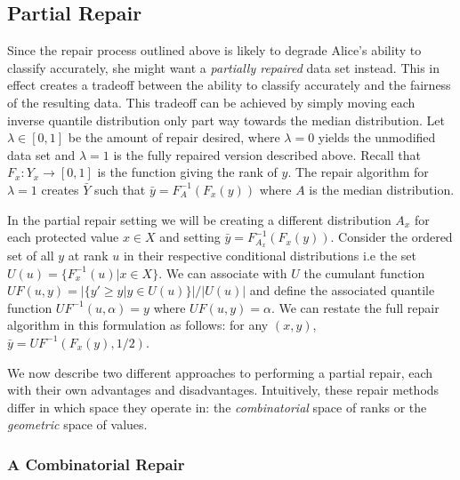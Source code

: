 \subsection{Partial Repair}
Since the repair process outlined above is likely to degrade Alice's ability to classify accurately, she might want a \emph{partially repaired} data set instead.  This in effect creates a tradeoff between the ability to classify accurately and the fairness of the resulting data. This tradeoff can be achieved by simply moving each inverse quantile distribution only part way towards the median distribution.  Let $\lambda \in [0,1]$ be the amount of repair desired, where $\lambda = 0$ yields the unmodified data set and $\lambda = 1$ is the fully repaired version described above.  Recall that $F_x: Y_x \rightarrow [0,1]$ is the function giving the rank of $y$.  The repair algorithm for $\lambda = 1$ creates $\bar{Y}$ such that $\bar{y} = F_{A}^{-1}(F_x(y))$ where $A$ is the median distribution.  

In the partial repair setting we will be creating a different distribution $A_x$ for each protected value $x \in X$ and setting $\bar{y} = F_{A_x}^{-1}(F_x(y))$. Consider the ordered set of all  $y$ at rank $u$ in their respective conditional distributions i.e the set $U(u) = \{ F_x^{-1}(u) | x \in X \}$. We can associate with $U$ the cumulant function $UF(u, y) = |\{ y' \ge y | y \in U(u) \}| / |U(u)|$ and define the associated quantile function $UF^{-1}(u, \alpha) = y$ where $UF(u, y) = \alpha$. We can restate the full repair algorithm in this formulation as follows: for any $(x,y)$,  $\bar{y} = UF^{-1}(F_x(y), 1/2)$. 

We now describe two different approaches to performing a partial repair, each with their own advantages and disadvantages. Intuitively, these repair methods differ in which space they operate in: the \emph{combinatorial} space of ranks or the \emph{geometric} space of values. 
\subsubsection{A Combinatorial Repair}
\label{sec:combinatorial-repair}

